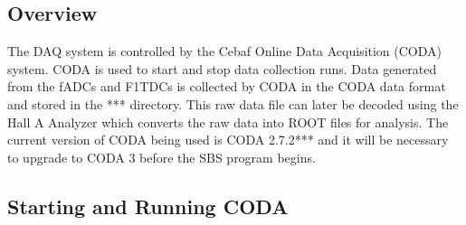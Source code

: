 \documentclass[oneside]{book}   %
\begin{document}
\subsection{Overview}
\label{ssec:coda_overview}

The DAQ system is controlled by the Cebaf Online Data Acquisition (CODA) system. CODA is used to start and stop data collection runs. Data generated from the fADCs and F1TDCs is collected by CODA in the CODA data format and stored in the *** directory. This raw data file can later be decoded using the Hall A Analyzer which converts the raw data into ROOT files for analysis. The current version of CODA being used is CODA 2.7.2*** and it will be necessary to upgrade to CODA 3 before the SBS program begins.

\subsection{Starting and Running CODA}
\label{ssec:running_coda}
\end{document}
